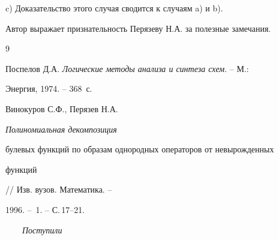 c) Доказательство этого случая сводится к случаям a) и b).





Автор выражает признательность Перязеву Н.А. за полезные замечания.





\begin{thebibliography}{9}







Поспелов Д.А. {\em Логические методы анализа и синтеза схем}. -- М.:


Энергия, 1974. -- 368~с.







Винокуров С.Ф., Перязев Н.А. {\em Полиномиальная декомпозиция


булевых функций по образам однородных операторов от невырожденных


функций} // Изв. вузов. Математика. --


1996. -- \No\,1. -- С.\,17--21.





\end{thebibliography}





\vskip 2cm







{$\qquad$\it Поступили}












